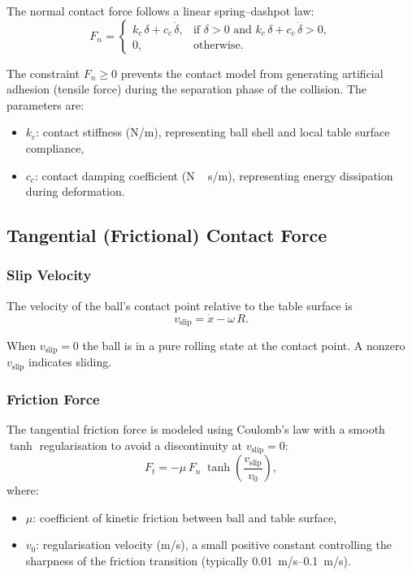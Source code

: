 \documentclass[11pt,a4paper]{article}
\begin{document}
The normal contact force follows a linear spring--dashpot law:
\begin{equation}
  F_n =
  \begin{cases}
    k_c\,\delta + c_c\,\dot{\delta}, & \text{if } \delta > 0 \text{ and }
      k_c\,\delta + c_c\,\dot{\delta} > 0, \\
    0, & \text{otherwise}.
  \end{cases}
  \label{eq:Fn}
\end{equation}

The constraint $F_n \geq 0$ prevents the contact model from generating
artificial adhesion (tensile force) during the separation phase of the
collision. The parameters are:
\begin{itemize}[nosep]
  \item $k_c$: contact stiffness (\si{N/m}), representing ball shell and local
    table surface compliance,
  \item $c_c$: contact damping coefficient (\si{N\,s/m}), representing energy
    dissipation during deformation.
\end{itemize}

\subsection{Tangential (Frictional) Contact Force}

\subsubsection{Slip Velocity}

The velocity of the ball's contact point relative to the table surface is
\begin{equation}
  v_{\text{slip}} = \dot{x} - \omega\,R.
  \label{eq:vslip}
\end{equation}

When $v_{\text{slip}} = 0$ the ball is in a pure rolling state at the contact
point. A nonzero $v_{\text{slip}}$ indicates sliding.

\subsubsection{Friction Force}

The tangential friction force is modeled using Coulomb's law with a smooth
$\tanh$ regularisation to avoid a discontinuity at $v_{\text{slip}} = 0$:
\begin{equation}
  F_t = -\mu\,F_n\;\tanh\!\left(\frac{v_{\text{slip}}}{v_0}\right),
  \label{eq:Ft}
\end{equation}
where:
\begin{itemize}[nosep]
  \item $\mu$: coefficient of kinetic friction between ball and table surface,
  \item $v_0$: regularisation velocity (\si{m/s}), a small positive constant
    controlling the sharpness of the friction transition (typically
    \SIrange{0.01}{0.1}{m/s}).
\end{itemize}
\end{document}
